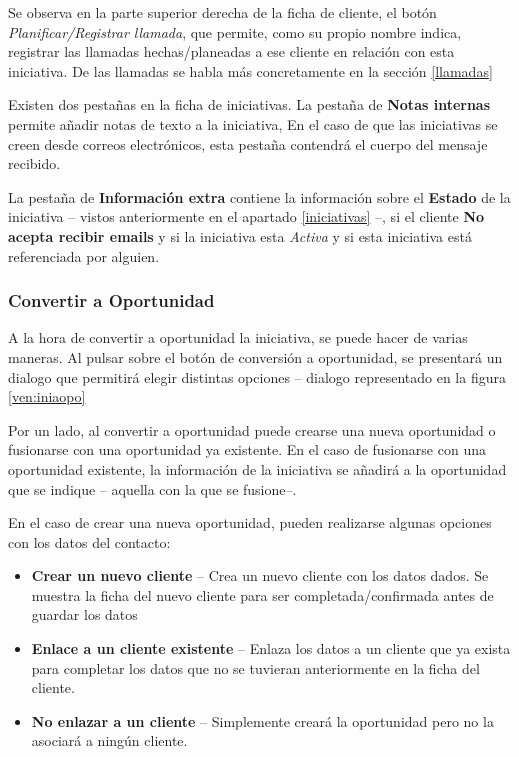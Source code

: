 Se observa en la parte superior derecha de la ficha de cliente, el botón \emph{Planificar/Registrar llamada}, que permite, como su propio nombre indica, registrar las llamadas hechas/planeadas a ese cliente en relación con esta iniciativa. De las llamadas se habla más concretamente en la sección \ref{llamadas}

Existen dos pestañas en la ficha de iniciativas. La pestaña de \textbf{Notas internas} permite añadir notas de texto a la iniciativa, En el caso de que las iniciativas se creen desde correos electrónicos, esta pestaña contendrá el cuerpo del mensaje recibido.

La pestaña de \textbf{Información extra} contiene la información sobre el \textbf{Estado} de la iniciativa -- vistos anteriormente en el apartado \ref{iniciativas} --, si el cliente \textbf{No acepta recibir emails} y si la iniciativa esta \emph{Activa} y si esta iniciativa está referenciada por alguien.


\subsubsection{Convertir a Oportunidad}
A la hora de convertir a oportunidad la iniciativa, se puede hacer de varias maneras. Al pulsar sobre el botón de conversión a oportunidad, se presentará un dialogo que permitirá elegir distintas opciones -- dialogo representado en la figura \ref{ven:iniaopo}

Por un lado, al convertir a oportunidad puede crearse una nueva oportunidad o fusionarse con una oportunidad ya existente. En el caso de fusionarse con una oportunidad existente, la información de la iniciativa se añadirá a la oportunidad que se indique -- aquella con la que se fusione--.

En el caso de crear una nueva oportunidad, pueden realizarse algunas opciones con los datos del contacto:

\begin{itemize}
  \item \textbf{Crear un nuevo cliente} -- Crea un nuevo cliente con los datos dados. Se muestra la 
        ficha del nuevo cliente para ser completada/confirmada antes de guardar los datos
  \item \textbf{Enlace a un cliente existente} -- Enlaza los datos a un cliente que ya exista para 
        completar los datos que no se tuvieran anteriormente en la ficha del cliente.
  \item \textbf{No enlazar a un cliente} -- Simplemente creará la oportunidad pero no la asociará a 
        ningún cliente.
\end{itemize}

